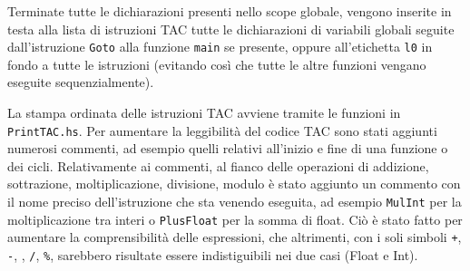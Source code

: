 
Terminate tutte le dichiarazioni presenti nello scope globale, vengono inserite in testa alla lista di istruzioni TAC tutte le dichiarazioni di variabili globali seguite dall'istruzione {\tt Goto} alla funzione {\tt main} se presente, oppure all'etichetta {\tt l0} in fondo a tutte le istruzioni (evitando così che tutte le altre funzioni vengano eseguite sequenzialmente).

La stampa ordinata delle istruzioni TAC avviene tramite le funzioni in {\tt PrintTAC.hs}. Per aumentare la leggibilità del codice TAC sono stati aggiunti numerosi commenti, ad esempio quelli relativi all'inizio e fine di una funzione o dei cicli. Relativamente ai commenti, al fianco delle operazioni di addizione, sottrazione, moltiplicazione, divisione, modulo è stato aggiunto un commento con il nome preciso dell'istruzione che sta venendo eseguita, ad esempio {\tt MulInt} per la moltiplicazione tra interi o {\tt PlusFloat} per la somma di float. Ciò è stato fatto per aumentare la comprensibilità delle espressioni, che altrimenti, con i soli simboli {\tt +}, {\tt -}, {\tt *}, {\tt /}, {\tt \%}, sarebbero risultate essere indistiguibili nei due casi (Float e Int).